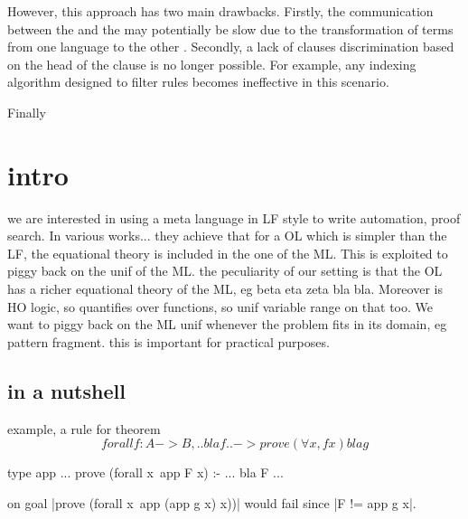 \documentclass{rapport}
\begin{document}
However, this approach has two main drawbacks. Firstly, the communication
between the \ol and the \ml may potentially be slow due to the transformation of
terms from one language to the other . Secondly, a lack of %
clauses discrimination based on the head of the clause is no longer
possible. For example, any indexing
algorithm designed to filter rules becomes ineffective in this scenario.

Finally 




  
\section{intro}

we are interested in using a meta language in LF style to write
automation, proof search. In various works... they achieve that
for a OL which is simpler than the LF, the equational theory is included
in the one of the ML. This is exploited to piggy back on the unif
of the ML.
the peculiarity of our setting is that the OL has a richer equational
theory of the ML, eg beta eta zeta bla bla. Moreover is HO logic, so
quantifies over functions, so unif variable range on that too.
We want to piggy back on the ML unif whenever the problem fits
in its domain, eg pattern fragment.
this is important for practical purposes.

\subsection{in a nutshell}
example, a rule for theorem
$$
forall f : A -> B, .. bla f .. -> prove (\forall x, f x)
bla g
$$
\begin{elpicode}
type app ...
prove (forall x\ app F x) :- ... bla F ...
\end{elpicode}
on goal |prove (forall x\ app (app g x) x))|
would fail since |F != app g x|.
\end{document}

